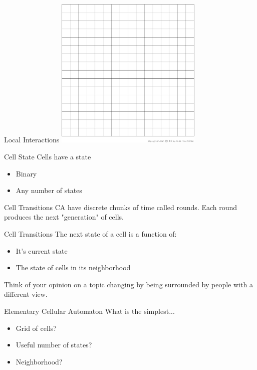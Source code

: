 \documentclass[bigger]{beamer}
\begin{document}
\begin{frame}[label=sec-5]{Local Interactions}
\includegraphics[width=7cm]{images/grid.png}
\end{frame}

\begin{frame}[label=sec-6]{Cell State}
Cells have a state
\begin{itemize}
\item<1->Binary
\item<2->Any number of states
\end{itemize}
\end{frame}

\begin{frame}[label=sec-7]{Cell Transitions}
CA have discrete chunks of time called rounds. Each round produces the next "generation" of cells.
\end{frame}

\begin{frame}[label=sec-8]{Cell Transitions}
The next state of a cell is a function of:
\begin{itemize}
\item<1->It's current state
\item<2->The state of cells in its neighborhood
\end{itemize}
\pause
\pause
Think of your opinion on a topic changing by being surrounded by people with a different view.
\end{frame}

\begin{frame}[label=sec-9]{Elementary Cellular Automaton}
What is the simplest...
\begin{itemize}
\item<1->Grid of cells?
\item<2->Useful number of states?
\item<3->Neighborhood?
\end{itemize}
\end{frame}
\end{document}
